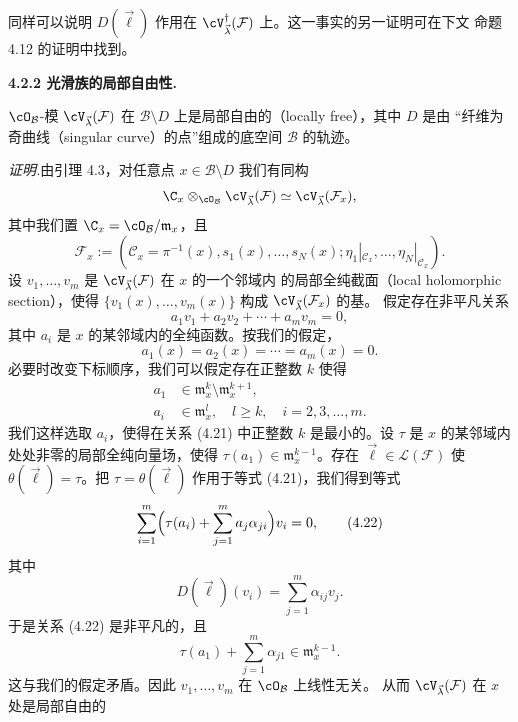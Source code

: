 同样可以说明 $D(\vec{\ell})$ 作用在
$\cV_{\vec{\lambda}}^\dagger(\mathcal{F})$ 上。这一事实的另一证明可在下文
命题 4.12 的证明中找到。

\noindent\textbf{4.2.2 光滑族的局部自由性.}\quad

\begin{theorem}[4.8]
$\cO_\mathcal{B}$-模 $\cV_{\vec{\lambda}}(\mathcal{F})$ 在
$\mathcal{B}\setminus D$ 上是局部自由的（locally free），其中 $D$ 是由
“纤维为奇曲线（singular curve）的点”组成的底空间 $\mathcal{B}$ 的轨迹。
\end{theorem}

\noindent\textit{证明.}\quad 由引理 4.3，对任意点
$x\in\mathcal{B}\setminus D$ 我们有同构
\[
  \C_x\otimes_{\cO_\mathcal{B}}\cV_{\vec{\lambda}}(\mathcal{F})
  \simeq\cV_{\vec{\lambda}}(\mathcal{F}_x),
\]
其中我们置 $\C_x=\cO_{\mathcal{B}}/\mathfrak{m}_x$，且
\[
  \mathcal{F}_x := (\mathcal{C}_x=\pi^{-1}(x),s_1(x),\dots,s_N(x);
  \eta_1|_{\mathcal{C}_x},\dots,\eta_N|_{\mathcal{C}_x}) .
\]
设 $v_1,\dots,v_m$ 是 $\cV_{\vec{\lambda}}(\mathcal{F})$ 在 $x$ 的一个邻域内
的局部全纯截面（local holomorphic section），使得
$\{v_1(x),\dots,v_m(x)\}$ 构成 $\cV_{\vec{\lambda}}(\mathcal{F}_x)$ 的基。
假定存在非平凡关系
\begin{equation}
  a_1v_1+a_2v_2+\cdots+a_mv_m=0, \tag{4.21}
\end{equation}
其中 $a_i$ 是 $x$ 的某邻域内的全纯函数。按我们的假定，
\[
  a_1(x)=a_2(x)=\cdots=a_m(x)=0 .
\]
必要时改变下标顺序，我们可以假定存在正整数 $k$ 使得
\[
  \begin{aligned}
  a_1 &\in \mathfrak{m}_x^k\setminus\mathfrak{m}_x^{k+1},\\
  a_i &\in \mathfrak{m}_x^l,\quad l\ge k,\quad i=2,3,\dots,m .
  \end{aligned}
\]
我们这样选取 $a_i$，使得在关系 (4.21) 中正整数 $k$ 是最小的。设 $\tau$ 是
$x$ 的某邻域内处处非零的局部全纯向量场，使得
$\tau(a_1)\in\mathfrak{m}_x^{k-1}$。存在 $\vec{\ell}\in\mathcal{L}(\mathcal{F})$
使 $\theta(\vec{\ell})=\tau$。把 $\tau=\theta(\vec{\ell})$ 作用于等式
(4.21)，我们得到等式
\begin{equation}
  \sum_{i=1}^m\Bigl(\tau(a_i)+\sum_{j=1}^ma_j\alpha_{ji}\Bigr)v_i=0,
  \tag{4.22}
\end{equation}
其中
\[
  D(\vec{\ell})(v_i)=\sum_{j=1}^m\alpha_{ij}v_j .
\]
于是关系 (4.22) 是非平凡的，且
\[
  \tau(a_1)+\sum_{j=1}^m\alpha_{j1}\in\mathfrak{m}_x^{k-1} .
\]
这与我们的假定矛盾。因此 $v_1,\dots,v_m$ 在 $\cO_\mathcal{B}$ 上线性无关。
从而 $\cV_{\vec{\lambda}}(\mathcal{F})$ 在 $x$ 处是局部自由的
